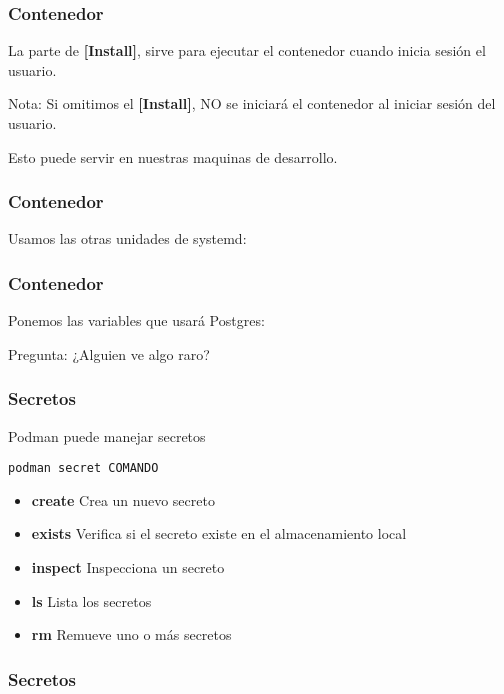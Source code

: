 \begin{frame}[fragile]
  \frametitle{Contenedor}
  La parte de  \textbf{[Install]}, sirve para ejecutar el contenedor cuando
  inicia sesión el usuario.
  
  \pausa
  \begin{alertblock}{Nota:}
    Si omitimos el \textbf{[Install]}, NO se iniciará el contenedor al
    iniciar sesión del usuario.
  \end{alertblock}
  Esto puede servir en nuestras maquinas de desarrollo.
\end{frame}

\begin{frame}[fragile]
  \frametitle{Contenedor}
  Usamos las otras unidades de systemd:
  
\end{frame}

\begin{frame}[fragile]
  \frametitle{Contenedor}
  Ponemos las variables que usará Postgres:
  
  \pausa
  \begin{alertblock}{Pregunta:}
    ¿Alguien ve algo raro?
  \end{alertblock}
\end{frame}

\begin{frame}[fragile]
  \frametitle{Secretos}
  Podman puede manejar secretos 
  \begin{lstlisting}
podman secret COMANDO
  \end{lstlisting}

  \begin{itemize}
    \item \textbf{create} Crea un nuevo secreto
    \pausa
    \item \textbf{exists} Verifica si el secreto existe en el
      almacenamiento local
    \pausa
    \item \textbf{inspect} Inspecciona un secreto
    \pausa
    \item \textbf{ls} Lista los secretos
    \pausa
    \item \textbf{rm} Remueve uno o más secretos
  \end{itemize}
\end{frame}

\begin{frame}[fragile]
  \frametitle{Secretos}
  
\end{frame}

